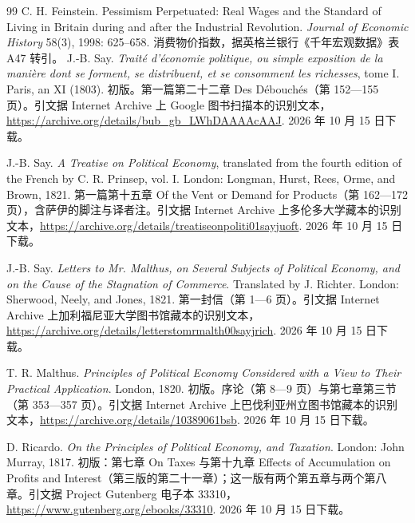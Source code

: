 \begin{thebibliography}{99}
 C. H. Feinstein. Pessimism Perpetuated: Real Wages and the Standard of Living in Britain during and after the Industrial Revolution. \emph{Journal of Economic History} 58(3), 1998: 625--658. 消费物价指数，据英格兰银行《千年宏观数据》表 A47 转引。
 J.-B. Say. \emph{Traité d'économie politique, ou simple exposition de la manière dont se forment, se distribuent, et se consomment les richesses}, tome I. Paris, an XI (1803). 初版。第一篇第二十二章 Des Débouchés（第 152—155 页）。引文据 Internet Archive 上 Google 图书扫描本的识别文本，\url{https://archive.org/details/bub_gb_LWhDAAAAcAAJ}. 2026 年 10 月 15 日下载。

 J.-B. Say. \emph{A Treatise on Political Economy}, translated from the fourth edition of the French by C. R. Prinsep, vol. I. London: Longman, Hurst, Rees, Orme, and Brown, 1821. 第一篇第十五章 Of the Vent or Demand for Products（第 162—172 页），含萨伊的脚注与译者注。引文据 Internet Archive 上多伦多大学藏本的识别文本，\url{https://archive.org/details/treatiseonpoliti01sayjuoft}. 2026 年 10 月 15 日下载。

 J.-B. Say. \emph{Letters to Mr. Malthus, on Several Subjects of Political Economy, and on the Cause of the Stagnation of Commerce}. Translated by J. Richter. London: Sherwood, Neely, and Jones, 1821. 第一封信（第 1—6 页）。引文据 Internet Archive 上加利福尼亚大学图书馆藏本的识别文本，\url{https://archive.org/details/letterstomrmalth00sayjrich}. 2026 年 10 月 15 日下载。

 T. R. Malthus. \emph{Principles of Political Economy Considered with a View to Their Practical Application}. London, 1820. 初版。序论（第 8—9 页）与第七章第三节（第 353—357 页）。引文据 Internet Archive 上巴伐利亚州立图书馆藏本的识别文本，\url{https://archive.org/details/10389061bsb}. 2026 年 10 月 15 日下载。

 D. Ricardo. \emph{On the Principles of Political Economy, and Taxation}. London: John Murray, 1817. 初版：第七章 On Taxes 与第十九章 Effects of Accumulation on Profits and Interest（第三版的第二十一章）；这一版有两个第五章与两个第八章。引文据 Project Gutenberg 电子本 33310，\url{https://www.gutenberg.org/ebooks/33310}. 2026 年 10 月 15 日下载。


\end{thebibliography}
